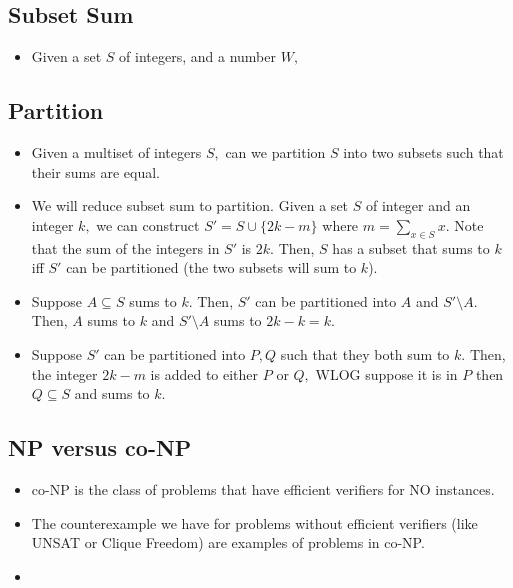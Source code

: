 \documentclass[a4paper,12pt]{article}
\begin{document}
\subsection{Subset Sum}
\begin{itemize}
    \item Given a set $S$ of integers, and a number $W,$
\end{itemize}
\subsection{Partition}
\begin{itemize}
    \item Given a multiset of integers $S,$ can we partition $S$ into two subsets such that their sums are equal.
    \item We will reduce subset sum to partition. Given a set $S$ of integer and an integer $k,$ we can construct $S'=S\cup\{2k-m\}$ where $m=\sum_{x\in S}x.$ Note that the sum of the integers in $S'$ is $2k.$ Then, $S$ has a subset that sums to $k$ iff $S'$ can be partitioned (the two subsets will sum to $k$).
    \item Suppose $A\subseteq S$ sums to $k.$ Then, $S'$ can be partitioned into $A$ and $S'\setminus A.$ Then, $A$ sums to $k$ and $S'\setminus A$ sums to $2k-k=k.$
    \item Suppose $S'$ can be partitioned into $P,Q$ such that they both sum to $k.$ Then, the integer $2k-m$ is added to either $P$ or $Q,$ WLOG suppose it is in $P$ then $Q\subseteq S$ and sums to $k.$
\end{itemize}
\subsection{NP versus co-NP}
\begin{itemize}
    \item co-NP is the class of problems that have efficient verifiers for NO instances.
    \item The counterexample we have for problems without efficient verifiers (like UNSAT or Clique Freedom) are examples of problems in co-NP.
    \item 
\end{itemize}
\end{document}
